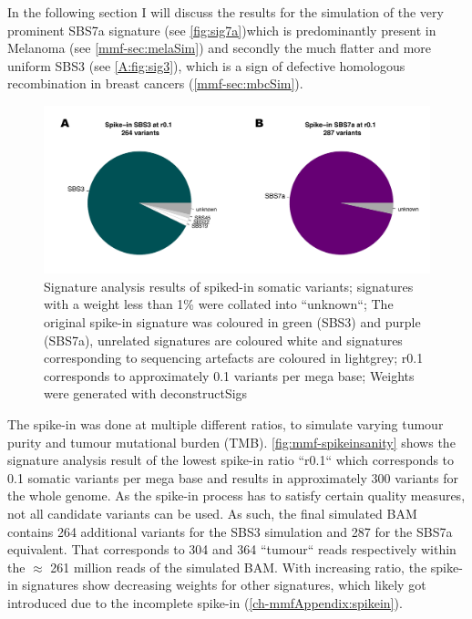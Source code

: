 In the following section I will discuss the results for the simulation of the very prominent SBS7a signature (see \autoref{fig:sig7a})which is predominantly present in Melanoma (see \autoref{mmf-sec:melaSim}) and secondly the much flatter and more uniform SBS3 (see \autoref{A:fig:sig3}), which is a sign of defective homologous recombination in breast cancers (\autoref{mmf-sec:mbcSim}). 


\begin{figure}[!ht]
\centering
\includegraphics[width=.9\linewidth]{Figures/MisMatchFinder/spikeInSanityCheck.pdf}
\caption[Signature analysis of spike-in somatic variants]{Signature analysis results of spiked-in somatic variants; signatures with a weight less than 1\% were collated into ``unknown``; The original spike-in signature was coloured in green (SBS3) and purple (SBS7a), unrelated signatures are coloured white and signatures corresponding to sequencing artefacts are coloured in lightgrey; r0.1 corresponds to approximately 0.1 variants per mega base; Weights were generated with deconstructSigs \cite{Rosenthal2016} }\label{fig:mmf-spikeinsanity}
\end{figure}

The spike-in was done at multiple different ratios, to simulate varying tumour purity and tumour mutational burden (TMB). \autoref{fig:mmf-spikeinsanity} shows the signature analysis result of the lowest spike-in ratio ``r0.1`` which corresponds to 0.1 somatic variants per mega base and results in approximately 300 variants for the whole genome. As the spike-in process has to satisfy certain quality measures, not all candidate variants can be used. As such, the final simulated BAM contains 264 additional variants for the SBS3 simulation and 287 for the SBS7a equivalent. That corresponds to 304 and 364 ``tumour`` reads respectively within the $\approx$ 261 million reads of the simulated BAM. With increasing ratio, the spike-in signatures show decreasing weights for other signatures, which likely got introduced due to the incomplete spike-in (\autoref{ch-mmfAppendix:spikein}).


